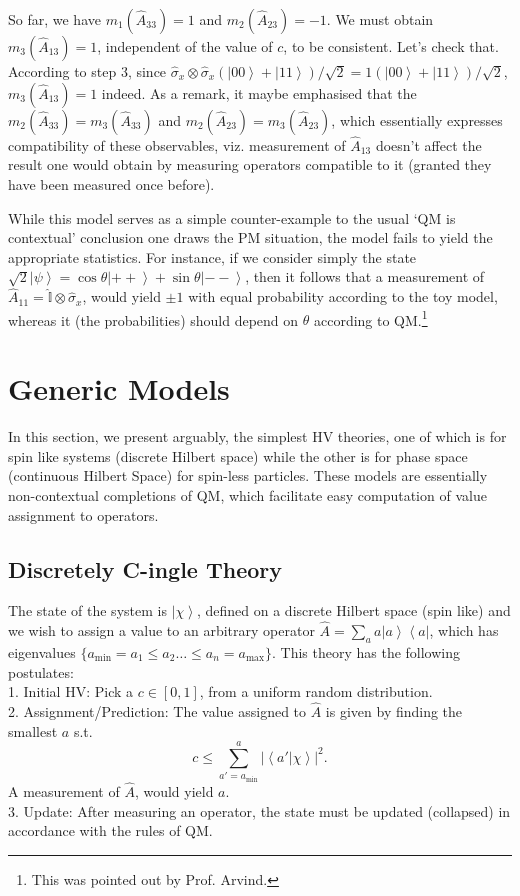So far, we have $m_{1}(\hat{A}_{33})=1$ and $m_{2}(\hat{A}_{23})=-1$.
We must obtain $m_{3}(\hat{A}_{13})=1$, independent of the value
of $c$, to be consistent. Let's check that. According to step 3,
since $\hat{\sigma}_{x}\otimes\hat{\sigma}_{x}\left(\left|00\right\rangle +\left|11\right\rangle \right)/\sqrt{2}=1\left(\left|00\right\rangle +\left|11\right\rangle \right)/\sqrt{2}$,
$m_{3}(\hat{A}_{13})=1$ indeed. As a remark, it maybe emphasised
that the $m_{2}(\hat{A}_{33})=m_{3}(\hat{A}_{33})$ and $m_{2}(\hat{A}_{23})=m_{3}(\hat{A}_{23})$,
which essentially expresses compatibility of these observables, viz.
measurement of $\hat{A}_{13}$ doesn't affect the result one would
obtain by measuring operators compatible to it (granted they have
been measured once before). 

While this model serves as a simple counter-example to the usual `QM
is contextual' conclusion one draws the PM situation, the model fails
to yield the appropriate statistics. For instance, if we consider
simply the state $\sqrt{2}\left|\psi\right\rangle =\cos\theta\left|++\right\rangle +\sin\theta\left|--\right\rangle $,
then it follows that a measurement of $\hat{A}_{11}=\hat{\mathbb{I}}\otimes\hat{\sigma}_{x}$,
would yield $\pm1$ with equal probability according to the toy model,
whereas it (the probabilities) should depend on $\theta$ according
to QM.\footnote{This was pointed out by Prof. Arvind.}


\section{Generic Models}

In this section, we present arguably, the simplest HV theories, one
of which is for spin like systems (discrete Hilbert space) while the
other is for phase space (continuous Hilbert Space) for spin-less
particles. These models are essentially non-contextual completions
of QM, which facilitate easy computation of value assignment to operators.


\subsection{Discretely C-ingle Theory \label{sub:Discretely-C-ingle-Theory}}

The state of the system is $\left|\chi\right\rangle $, defined on
a discrete Hilbert space (spin like) and we wish to assign a value
to an arbitrary operator $\hat{A}=\sum_{a}a\left|a\right\rangle \left\langle a\right|$,
which has eigenvalues $\{a_{\text{min}}=a_{1}\le a_{2}\dots\le a_{n}=a_{\text{max}}\}$.
This theory has the following postulates: \\
1. Initial HV: Pick a $c\in[0,1]$, from a uniform random distribution.\\
2. Assignment/Prediction: The value assigned to $\hat{A}$ is given
by finding the smallest $a$ s.t. 
\[
c\le\sum_{a'=a_{\text{min}}}^{a}\left|\left\langle a'|\chi\right\rangle \right|^{2}.
\]
 A measurement of $\hat{A}$, would yield $a$.\\
3. Update: After measuring an operator, the state must be updated
(collapsed) in accordance with the rules of QM.

